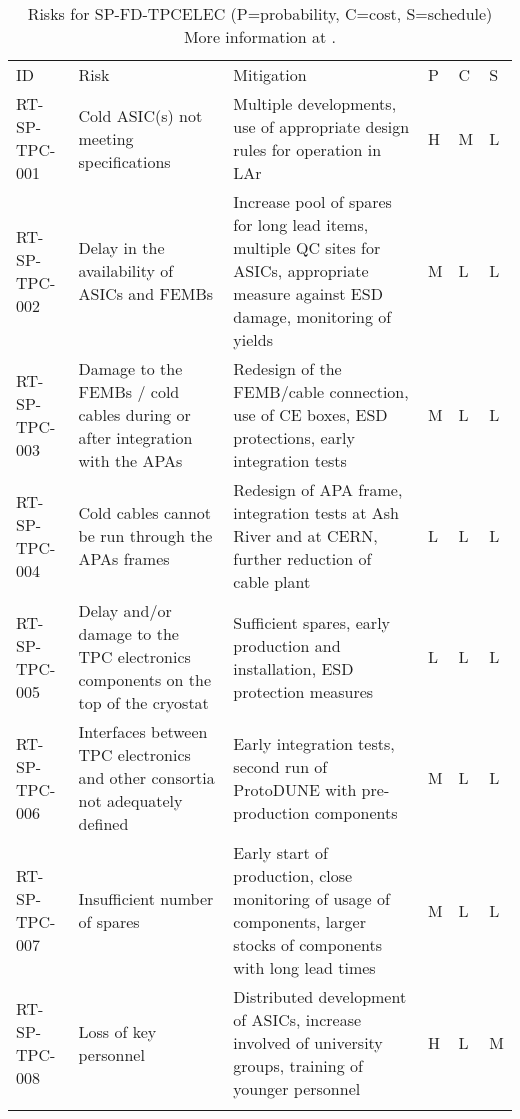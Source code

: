 
\begin{footnotesize}
\begin{longtable}{x{0.18\textwidth}x{0.20\textwidth}x{0.32\textwidth}x{0.02\textwidth}x{0.02\textwidth}x{0.02\textwidth}} 
\caption[Risks for SP-FD-TPCELEC]{Risks for SP-FD-TPCELEC (P=probability, C=cost, S=schedule) More information at . } \\
ID & Risk & Mitigation & P & C & S  \\  \colhline
RT-SP-TPC-001 & Cold ASIC(s) not meeting specifications & Multiple developments, use of appropriate design rules for operation in LAr & H  & M & L \\  \colhline
RT-SP-TPC-002 & Delay in the availability of ASICs and FEMBs & Increase pool of spares for long lead items, multiple QC sites for ASICs, appropriate measure against ESD damage, monitoring of yields & M & L & L \\  \colhline
RT-SP-TPC-003 & Damage to the FEMBs / cold cables during or after integration with the APAs & Redesign of the FEMB/cable connection, use of CE boxes, ESD protections, early integration tests & M & L & L \\  \colhline
RT-SP-TPC-004 & Cold cables cannot be run through the APAs frames & Redesign of APA frame, integration tests at Ash River and at CERN, further reduction of cable plant & L & L & L \\  \colhline
RT-SP-TPC-005 & Delay and/or damage to the TPC electronics components on the top of the cryostat & Sufficient spares, early production and installation, ESD protection measures & L & L & L \\  \colhline
RT-SP-TPC-006 & Interfaces between TPC electronics and other consortia not adequately defined & Early integration tests, second run of ProtoDUNE with pre-production components & M & L & L \\  \colhline
RT-SP-TPC-007 & Insufficient number of spares & Early start of production, close monitoring of usage of components, larger stocks of components with long lead times & M & L & L \\  \colhline
RT-SP-TPC-008 & Loss of key personnel & Distributed development of ASICs, increase involved of university groups, training of younger personnel & H & L & M \\  \colhline

\end{longtable}
\end{footnotesize}
